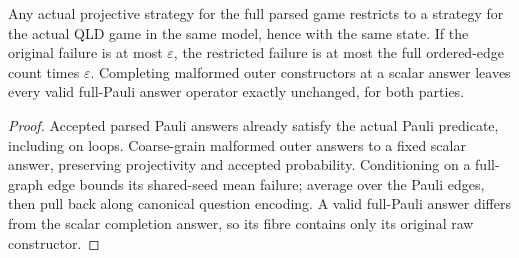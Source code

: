 \begin{lemma}
\label{lem:intro-pauli-restriction}
\leanok
Any actual projective strategy for the full parsed game restricts to a
strategy for the actual QLD game in the same model, hence with the same state.
If the original failure is at most $\varepsilon$, the restricted failure
is at most the full ordered-edge count times $\varepsilon$. Completing
malformed outer constructors at a scalar answer leaves every valid
full-Pauli answer operator exactly unchanged, for both parties.
\end{lemma}
\begin{proof}
\leanok
Accepted parsed Pauli answers already satisfy the actual Pauli predicate,
including on loops. Coarse-grain malformed outer answers to a fixed
scalar answer, preserving projectivity and accepted probability.
Conditioning on a full-graph edge bounds its shared-seed mean failure;
average over the Pauli edges, then pull back along canonical question
encoding. A valid full-Pauli answer differs from the scalar completion
answer, so its fibre contains only its original raw constructor.
\end{proof}

